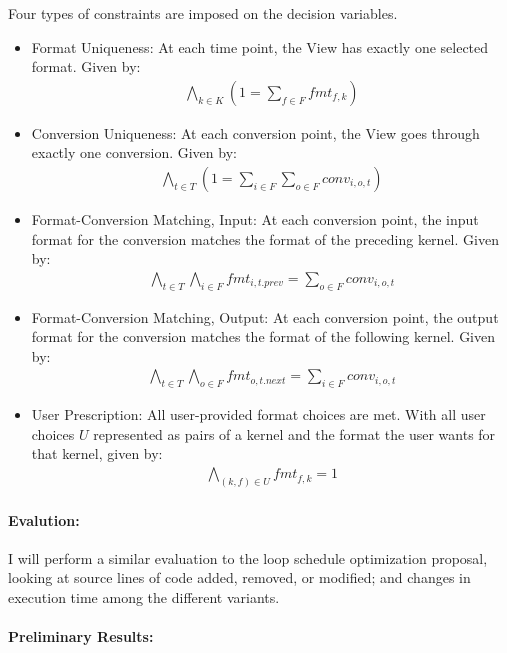 \documentclass{article}
\begin{document}
Four types of constraints are imposed on the decision variables.
\begin{itemize}
\item Format Uniqueness: At each time point, the View has exactly one selected format. Given by: 
\begin{align*}
	\bigwedge\limits_{k \in K} (1 = \sum\limits_{f \in F} fmt_{f,k})
\end{align*}
\item Conversion Uniqueness: At each conversion point, the View goes through exactly one conversion. Given by:
\begin{align*}
	\bigwedge\limits_{t \in T} (1 = \sum\limits_{i \in F}\sum\limits_{o \in F} conv_{i,o,t})
\end{align*}
\item Format-Conversion Matching, Input: At each conversion point, the input format for the conversion matches the format of the preceding kernel. Given by:
\begin{align*}
	\bigwedge\limits_{t \in T} \bigwedge\limits_{i \in F} fmt_{i,t.prev} = \sum\limits_{o \in F} conv_{i,o,t}
\end{align*}
\item Format-Conversion Matching, Output: At each conversion point, the output format for the conversion matches the format of the following kernel. Given by:
\begin{align*}
	\bigwedge\limits_{t \in T} \bigwedge\limits_{o \in F} fmt_{o,t.next} = \sum\limits_{i \in F} conv_{i,o,t}
\end{align*}
\item User Prescription: All user-provided format choices are met. With all user choices $U$ represented as pairs of a kernel and the format the user wants for that kernel, given by:
\begin{align*}
	\bigwedge\limits_{(k,f) \in U}  fmt_{f,k} = 1
\end{align*}
\end{itemize}


\paragraph{Evalution:}

I will perform a similar evaluation to the loop schedule optimization proposal, looking at source lines of code added, removed, or modified; and changes in execution time among the different variants.


\paragraph{Preliminary Results:}
\end{document}
